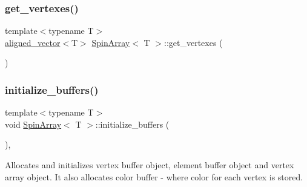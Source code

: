 \mbox{\label{classSpinArray_ac4a17ebe80ae433662d69537adf9a4de}} 
\subsubsection{\texorpdfstring{get\+\_\+vertexes()}{get\_vertexes()}\hspace{0.1cm}{\footnotesize\ttfamily [4/4]}}
{\footnotesize\ttfamily template$<$typename T$>$ \\
\mbox{\hyperlink{type__definitions_8hpp_a087efd587d66b881646ef378f1919c90}{aligned\+\_\+vector}}$<$T$>$ \mbox{\hyperlink{classSpinArray}{Spin\+Array}}$<$ T $>$\+::get\+\_\+vertexes (\begin{DoxyParamCaption}{ }\end{DoxyParamCaption})\hspace{0.3cm}{\ttfamily [inline]}}

\mbox{\label{classSpinArray_a3a7064b0c74a8a777d8a987f29c31108}} 
\subsubsection{\texorpdfstring{initialize\+\_\+buffers()}{initialize\_buffers()}\hspace{0.1cm}{\footnotesize\ttfamily [1/4]}}
{\footnotesize\ttfamily template$<$typename T$>$ \\
void \mbox{\hyperlink{classSpinArray}{Spin\+Array}}$<$ T $>$\+::initialize\+\_\+buffers (\begin{DoxyParamCaption}{ }\end{DoxyParamCaption})\hspace{0.3cm}{\ttfamily [inline]}, {\ttfamily [private]}}



Allocates and initializes vertex buffer object, element buffer object and vertex array object. It also allocates color buffer -\/ where color for each vertex is stored. 

\mbox{\label{classSpinArray_a3a7064b0c74a8a777d8a987f29c31108}} 
